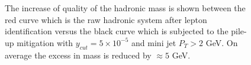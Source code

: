 \begin{figure}
\begin{minipage}{0.49\textwidth}
        \caption{The increase of quality of the hadronic mass is shown between the red curve which is the raw hadronic system after lepton identification versus the black curve which is subjected to the pile-up mitigation with $y_{cut} = 5\times10^{-5}$ and mini jet $P_T > 2$ GeV. On average the excess in mass is reduced by $\approx 5$ GeV. }
        \label{fig:supmass}
    \end{minipage}
\end{figure}


